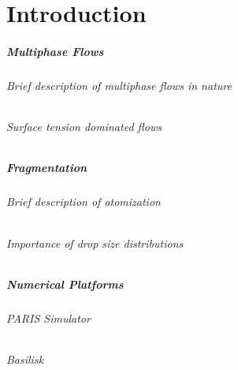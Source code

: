 \setchapterpreamble[u]{\margintoc}
\chapter{Introduction}

\paragraph{Multiphase Flows}

\subparagraph{Brief description of multiphase flows in nature}
\blindtext

\subparagraph{Surface tension dominated flows}
\blindtext



\paragraph{Fragmentation}

\subparagraph{Brief description of atomization}
\blindtext


\subparagraph{Importance of drop size distributions}
\blindtext


\paragraph{Numerical Platforms}

\subparagraph{PARIS Simulator}
\blindtext


\subparagraph{Basilisk}
\blindtext


